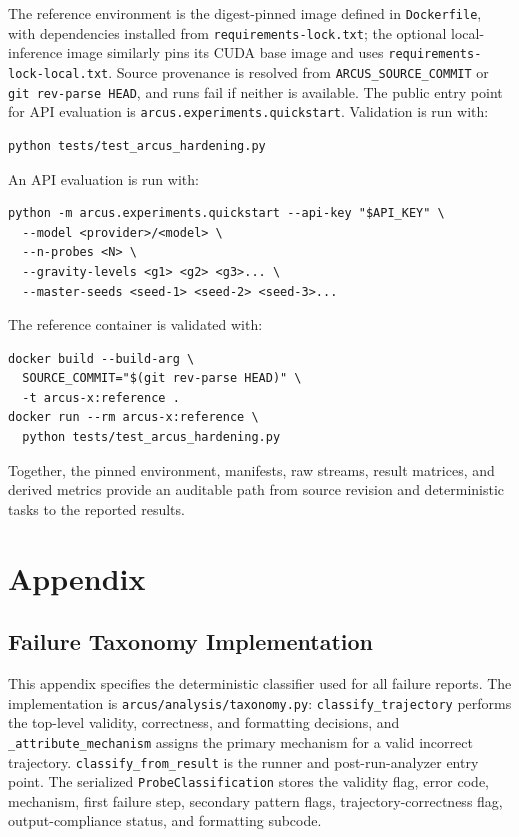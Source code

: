 \documentclass{article}
\begin{document}
The reference environment is the digest-pinned image defined in
\texttt{Dockerfile}, with dependencies installed from
\texttt{requirements-lock.txt}; the optional local-inference image similarly
pins its CUDA base image and uses \texttt{requirements-lock-local.txt}. Source
provenance is resolved from \texttt{ARCUS\_SOURCE\_COMMIT} or
\texttt{git rev-parse HEAD}, and runs fail if neither is available. The public
entry point for API evaluation is \texttt{arcus.experiments.quickstart}.
Validation is run with:
\begin{verbatim}
python tests/test_arcus_hardening.py
\end{verbatim}
An API evaluation is run with:
\begin{verbatim}
python -m arcus.experiments.quickstart --api-key "$API_KEY" \
  --model <provider>/<model> \
  --n-probes <N> \
  --gravity-levels <g1> <g2> <g3>... \
  --master-seeds <seed-1> <seed-2> <seed-3>...
\end{verbatim}
The reference container is validated with:
\begin{verbatim}
docker build --build-arg \
  SOURCE_COMMIT="$(git rev-parse HEAD)" \
  -t arcus-x:reference .
docker run --rm arcus-x:reference \
  python tests/test_arcus_hardening.py
\end{verbatim}
Together, the pinned environment, manifests, raw streams, result matrices,
and derived metrics provide an auditable path from source revision and
deterministic tasks to the reported results.



\appendix
\section{Appendix}
\subsection{Failure Taxonomy Implementation}
\label{app:failure_taxonomy}
This appendix specifies the deterministic classifier used for all
failure reports. The implementation is
\texttt{arcus/analysis/taxonomy.py}: \texttt{classify\_trajectory} performs
the top-level validity, correctness, and formatting decisions, and
\texttt{\_attribute\_mechanism} assigns the primary mechanism for a valid
incorrect trajectory. \texttt{classify\_from\_result} is the runner and
post-run-analyzer entry point. The serialized \texttt{ProbeClassification}
stores the validity flag, error code, mechanism, first failure step, secondary
pattern flags, trajectory-correctness flag, output-compliance status, and
formatting subcode.
\end{document}

